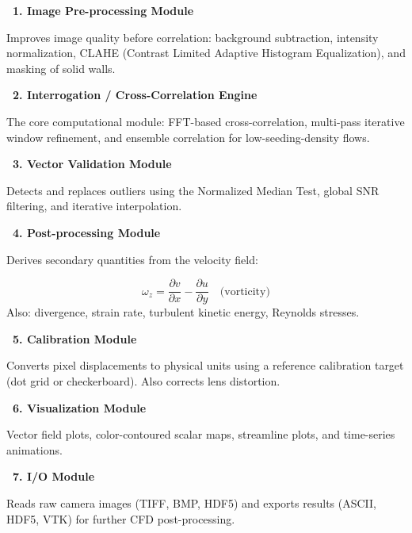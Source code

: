 \documentclass[12pt,a4paper]{article}
\begin{document}
\begin{answerbox}

\textbf{\color{deepblue}~1. Image Pre-processing Module}

Improves image quality before correlation: background subtraction, intensity normalization, CLAHE (Contrast Limited Adaptive Histogram Equalization), and masking of solid walls.

\vspace{0.5em}
\textbf{\color{deepblue}~2. Interrogation / Cross-Correlation Engine}

The core computational module: FFT-based cross-correlation, multi-pass iterative window refinement, and ensemble correlation for low-seeding-density flows.

\vspace{0.5em}
\textbf{\color{deepblue}~3. Vector Validation Module}

Detects and replaces outliers using the Normalized Median Test, global SNR filtering, and iterative interpolation.

\vspace{0.5em}
\textbf{\color{deepblue}~4. Post-processing Module}

Derives secondary quantities from the velocity field:
\begin{mathbox}
\begin{equation}
    \omega_z = \frac{\partial v}{\partial x} - \frac{\partial u}{\partial y} \quad \text{(vorticity)}
\end{equation}
Also: divergence, strain rate, turbulent kinetic energy, Reynolds stresses.
\end{mathbox}

\vspace{0.5em}
\textbf{\color{deepblue}~5. Calibration Module}

Converts pixel displacements to physical units using a reference calibration target (dot grid or checkerboard). Also corrects lens distortion.

\vspace{0.5em}
\textbf{\color{deepblue}~6. Visualization Module}

Vector field plots, color-contoured scalar maps, streamline plots, and time-series animations.

\vspace{0.5em}
\textbf{\color{deepblue}~7. I/O Module}

Reads raw camera images (TIFF, BMP, HDF5) and exports results (ASCII, HDF5, VTK) for further CFD post-processing.
\end{answerbox}
\end{document}
